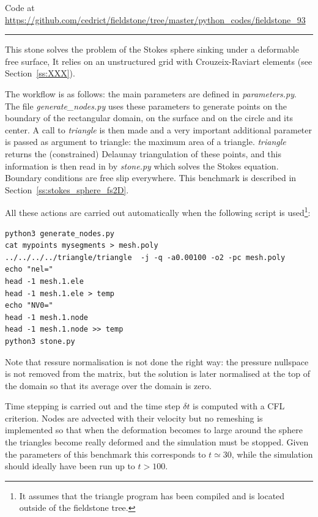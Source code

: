 

\begin{center}
Code at \url{https://github.com/cedrict/fieldstone/tree/master/python_codes/fieldstone_93}
\end{center}

\par\noindent\rule{\textwidth}{0.4pt}



This stone solves the problem of the Stokes sphere sinking under a deformable free surface, 
It relies on an unstructured grid with Crouzeix-Raviart elements (see Section~\ref{ss:XXX}).

The workflow is as follows: the main parameters are defined in {\sl parameters.py}.
The file {\sl generate\_nodes.py} uses these parameters to generate points on the 
boundary of the rectangular domain, on the surface and on the circle and its center. 
A call to {\sl triangle} is then made and a very important additional parameter is passed
as argument to triangle: the maximum area of a triangle. 
{\sl triangle} returns the (constrained) Delaunay triangulation of these points, 
and this information is then read in by {\sl stone.py} which solves the 
Stokes equation. 
Boundary conditions are free slip everywhere. This benchmark is described in 
Section~\ref{ss:stokes_sphere_fs2D}.

All these actions are carried out automatically when the following script is 
used\footnote{It assumes that the triangle program has been compiled and 
is located outside of the fieldstone tree.}:
\begin{lstlisting}
python3 generate_nodes.py
cat mypoints mysegments > mesh.poly
../../../../triangle/triangle  -j -q -a0.00100 -o2 -pc mesh.poly
echo "nel="
head -1 mesh.1.ele 
head -1 mesh.1.ele > temp
echo "NV0="
head -1 mesh.1.node 
head -1 mesh.1.node >> temp
python3 stone.py
\end{lstlisting}


Note that ressure normalisation is not done the right way: the pressure nullspace is 
not removed from the matrix, but the solution is later normalised at the top
of the domain so that its average over the domain is zero.

Time stepping is carried out and the time step $\delta t$ is computed with a CFL criterion.
Nodes are advected with their velocity but no remeshing is implemented so that when the 
deformation becomes to large around the sphere the triangles become really deformed and 
the simulation must be stopped. Given the parameters of this benchmark this corresponds 
to $t\simeq 30$, while the simulation should ideally have been run up to $t>100$.

